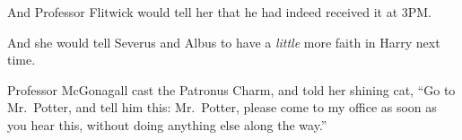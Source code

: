 And Professor Flitwick would tell her that he had indeed received it at
3PM.

And she would tell Severus and Albus to have a \emph{little} more faith
in Harry next time.

Professor McGonagall cast the Patronus Charm, and told her shining cat,
``Go to Mr.~Potter, and tell him this: Mr.~Potter, please come to my
office as soon as you hear this, without doing anything else along the
way.''
